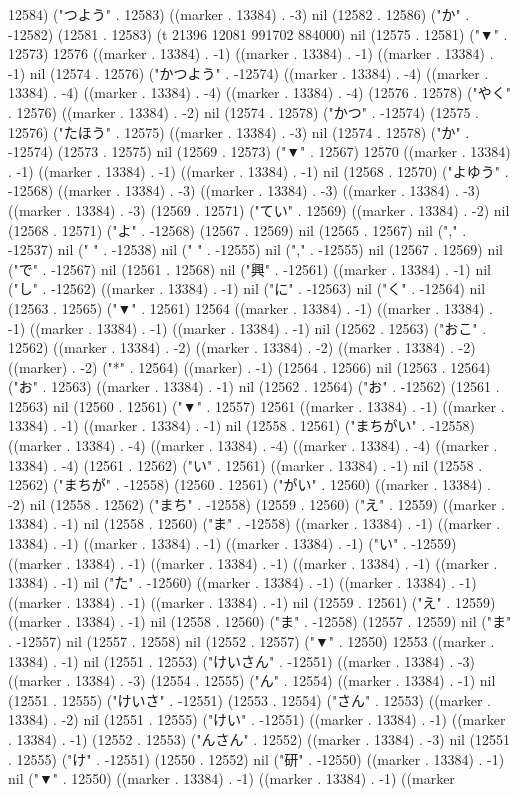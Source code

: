12584) ("つよう" . 12583) ((marker . 13384) . -3) nil (12582 . 12586) ("か" . -12582) (12581 . 12583) (t 21396 12081 991702 884000) nil (12575 . 12581) ("▼" . 12573) 12576 ((marker . 13384) . -1) ((marker . 13384) . -1) ((marker . 13384) . -1) nil (12574 . 12576) ("かつよう" . -12574) ((marker . 13384) . -4) ((marker . 13384) . -4) ((marker . 13384) . -4) ((marker . 13384) . -4) (12576 . 12578) ("やく" . 12576) ((marker . 13384) . -2) nil (12574 . 12578) ("かつ" . -12574) (12575 . 12576) ("たほう" . 12575) ((marker . 13384) . -3) nil (12574 . 12578) ("か" . -12574) (12573 . 12575) nil (12569 . 12573) ("▼" . 12567) 12570 ((marker . 13384) . -1) ((marker . 13384) . -1) ((marker . 13384) . -1) nil (12568 . 12570) ("よゆう" . -12568) ((marker . 13384) . -3) ((marker . 13384) . -3) ((marker . 13384) . -3) ((marker . 13384) . -3) (12569 . 12571) ("てい" . 12569) ((marker . 13384) . -2) nil (12568 . 12571) ("よ" . -12568) (12567 . 12569) nil (12565 . 12567) nil ("," . -12537) nil (" " . -12538) nil (" " . -12555) nil ("," . -12555) nil (12567 . 12569) nil ("で" . -12567) nil (12561 . 12568) nil ("興" . -12561) ((marker . 13384) . -1) nil ("し" . -12562) ((marker . 13384) . -1) nil ("に" . -12563) nil ("く" . -12564) nil (12563 . 12565) ("▼" . 12561) 12564 ((marker . 13384) . -1) ((marker . 13384) . -1) ((marker . 13384) . -1) ((marker . 13384) . -1) nil (12562 . 12563) ("おこ" . 12562) ((marker . 13384) . -2) ((marker . 13384) . -2) ((marker . 13384) . -2) ((marker) . -2) ("*" . 12564) ((marker) . -1) (12564 . 12566) nil (12563 . 12564) ("お" . 12563) ((marker . 13384) . -1) nil (12562 . 12564) ("お" . -12562) (12561 . 12563) nil (12560 . 12561) ("▼" . 12557) 12561 ((marker . 13384) . -1) ((marker . 13384) . -1) ((marker . 13384) . -1) nil (12558 . 12561) ("まちがい" . -12558) ((marker . 13384) . -4) ((marker . 13384) . -4) ((marker . 13384) . -4) ((marker . 13384) . -4) (12561 . 12562) ("い" . 12561) ((marker . 13384) . -1) nil (12558 . 12562) ("まちが" . -12558) (12560 . 12561) ("がい" . 12560) ((marker . 13384) . -2) nil (12558 . 12562) ("まち" . -12558) (12559 . 12560) ("え" . 12559) ((marker . 13384) . -1) nil (12558 . 12560) ("ま" . -12558) ((marker . 13384) . -1) ((marker . 13384) . -1) ((marker . 13384) . -1) ((marker . 13384) . -1) ("い" . -12559) ((marker . 13384) . -1) ((marker . 13384) . -1) ((marker . 13384) . -1) ((marker . 13384) . -1) nil ("た" . -12560) ((marker . 13384) . -1) ((marker . 13384) . -1) ((marker . 13384) . -1) ((marker . 13384) . -1) nil (12559 . 12561) ("え" . 12559) ((marker . 13384) . -1) nil (12558 . 12560) ("ま" . -12558) (12557 . 12559) nil ("ま" . -12557) nil (12557 . 12558) nil (12552 . 12557) ("▼" . 12550) 12553 ((marker . 13384) . -1) nil (12551 . 12553) ("けいさん" . -12551) ((marker . 13384) . -3) ((marker . 13384) . -3) (12554 . 12555) ("ん" . 12554) ((marker . 13384) . -1) nil (12551 . 12555) ("けいさ" . -12551) (12553 . 12554) ("さん" . 12553) ((marker . 13384) . -2) nil (12551 . 12555) ("けい" . -12551) ((marker . 13384) . -1) ((marker . 13384) . -1) (12552 . 12553) ("んさん" . 12552) ((marker . 13384) . -3) nil (12551 . 12555) ("け" . -12551) (12550 . 12552) nil ("研" . -12550) ((marker . 13384) . -1) nil ("▼" . 12550) ((marker . 13384) . -1) ((marker . 13384) . -1) ((marker 